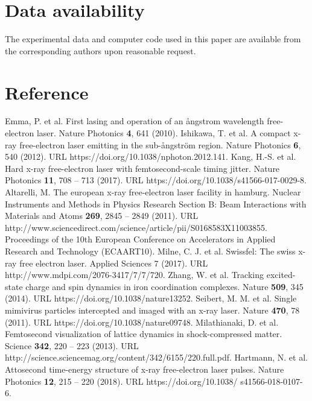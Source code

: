 \documentclass[%
 preprint,
 amsmath,amssymb,
 aps,
 prl,
 superscriptaddress,
 floatfix,
 letter,
]{revtex4-1}
\begin{document}
\section{Data availability}
The experimental data and computer code used in this paper are available from the corresponding authors upon reasonable request.

\section{Reference}
%
%
%
\begin{thebibliography}{99}
Emma, P. et al. First lasing and operation of an {\aa}ngstrom wavelength free-electron laser. Nature Photonics {\bf 4}, 641 (2010).
Ishikawa, T. et al. A compact x-ray free-electron laser emitting in the sub-{\aa}ngstr{\"{o}}m region. Nature Photonics {\bf 6}, 540 (2012). URL https://doi.org/10.1038/nphoton.2012.141.
Kang, H.-S. et al. Hard x-ray free-electron laser with femtosecond-scale timing jitter. Nature Photonics {\bf 11}, 708 -- 713 (2017). URL https://doi.org/10.1038/s41566-017-0029-8.
Altarelli, M. The european x-ray free-electron laser facility in hamburg. Nuclear Instruments and Methods in Physics Research Section B: Beam Interactions with Materials and Atoms {\bf 269}, 2845 -- 2849 (2011). URL http://www.sciencedirect.com/science/article/pii/S0168583X11003855. Proceedings of the 10th European Conference on Accelerators in Applied Research and Technology (ECAART10).
Milne, C. J. et al. Swissfel: The swiss x-ray free electron laser. Applied Sciences 7 (2017). URL http://www.mdpi.com/2076-3417/7/7/720.
Zhang, W. et al. Tracking excited-state charge and spin dynamics in iron coordination complexes. Nature {\bf 509}, 345 (2014). URL https://doi.org/10.1038/nature13252.
Seibert, M. M. et al. Single mimivirus particles intercepted and imaged with an x-ray laser. Nature {\bf 470}, 78 (2011). URL https://doi.org/10.1038/nature09748.
Milathianaki, D. et al. Femtosecond visualization of lattice dynamics in shock-compressed matter. Science {\bf 342}, 220 -- 223 (2013). URL http://science.sciencemag.org/content/342/6155/220.full.pdf.
Hartmann, N. et al. Attosecond time-energy structure of x-ray free-electron laser pulses. Nature Photonics {\bf 12}, 215 -- 220 (2018). URL https://doi.org/10.1038/
s41566-018-0107-6.

\end{thebibliography}
\end{document}
